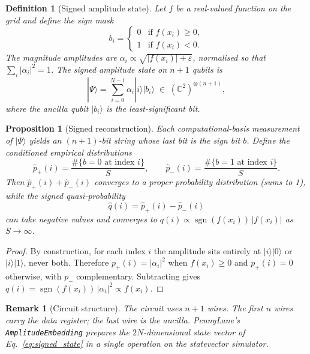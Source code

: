 \documentclass[11pt]{article}
\newtheorem{definition}{Definition}
\newtheorem{proposition}{Proposition}
\newtheorem{remark}{Remark}
\newcommand{\ket}[1]{|#1\rangle}
\DeclareMathOperator*{\sgn}{sgn}
\begin{document}
\begin{definition}[Signed amplitude state]\label{def:signed_state}
Let $f$ be a real-valued function on the grid and define the
\emph{sign mask}
\begin{equation}\label{eq:signmask}
  b_i =
  \begin{cases}
    0 & \text{if } f(x_i)\ge 0,\\
    1 & \text{if } f(x_i) < 0.
  \end{cases}
\end{equation}
The \emph{magnitude amplitudes} are
$\alpha_i \propto \sqrt{|f(x_i)|+\varepsilon}$, normalised so that
$\sum_i|\alpha_i|^2=1$.  The \emph{signed amplitude state} on
$n+1$ qubits is
\begin{equation}\label{eq:signed_state}
  \ket{\Psi}
  = \sum_{i=0}^{N-1} \alpha_i \ket{i}\ket{b_i}
  \;\in\;
  (\mathbb{C}^{2})^{\otimes(n+1)},
\end{equation}
where the ancilla qubit $\ket{b_i}$ is the least-significant bit.
\end{definition}

\begin{proposition}[Signed reconstruction]\label{prop:signed_recon}
Each computational-basis measurement of $\ket{\Psi}$ yields an
$(n+1)$-bit string whose last bit is the sign bit $b$.
Define the \emph{conditioned empirical distributions}
\begin{equation}\label{eq:ppm}
  \hat{p}_+(i) = \frac{\#\{b=0 \text{ at index } i\}}{S},
  \qquad
  \hat{p}_-(i) = \frac{\#\{b=1 \text{ at index } i\}}{S}.
\end{equation}
Then $\hat{p}_+(i)+\hat{p}_-(i)$ converges to a proper probability
distribution (sums to 1), while the \emph{signed quasi-probability}
\begin{equation}\label{eq:q_modeA}
  \hat{q}(i) = \hat{p}_+(i) - \hat{p}_-(i)
\end{equation}
can take negative values and converges to
$q(i) \propto \sgn(f(x_i))\,|f(x_i)|$ as $S\to\infty$.
\end{proposition}

\begin{proof}
By construction, for each index $i$ the amplitude sits entirely at
$\ket{i}\ket{0}$ or $\ket{i}\ket{1}$, never both.  Therefore
$p_+(i)=|\alpha_i|^2$ when $f(x_i)\ge 0$ and $p_+(i)=0$ otherwise,
with $p_-$ complementary.  Subtracting gives
$q(i)=\sgn(f(x_i))\,|\alpha_i|^2 \propto f(x_i)$.
\end{proof}

\begin{remark}[Circuit structure]
The circuit uses $n+1$ wires.  The first $n$ wires carry the data
register; the last wire is the ancilla.  PennyLane's
\texttt{AmplitudeEmbedding} prepares the $2N$-dimensional state
vector of Eq.~\eqref{eq:signed_state} in a single operation on the
statevector simulator.
\end{remark}
\end{document}
